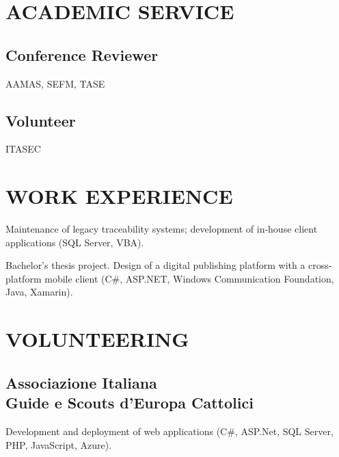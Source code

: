 \documentclass[a4paper]{deedy-resume-openfont}
\begin{document}
\begin{minipage}[t]{0.3\textwidth} 

\section{ACADEMIC SERVICE}

\subsection{Conference Reviewer}

AAMAS\@, SEFM\@, TASE\@
\sectionsep%

\subsection{Volunteer}

ITASEC

\section{WORK EXPERIENCE} 

\vspace{\topsep} %
Maintenance of legacy traceability systems; development of in-house client applications (SQL Server, VBA).
\sectionsep%

\vspace{\topsep} %
Bachelor's thesis project.
Design of a digital publishing platform with a cross-platform mobile client (C\#, ASP.NET, Windows Communication Foundation, Java, Xamarin).
\sectionsep%

\section{VOLUNTEERING}

\subsection{Associazione Italiana\\ Guide e Scouts d'Europa Cattolici}
\vspace{\topsep} %
Development and deployment of web applications
(C\#, ASP.Net, SQL Server, PHP, JavaScript, Azure).
\sectionsep%


\end{minipage}
\end{document}
